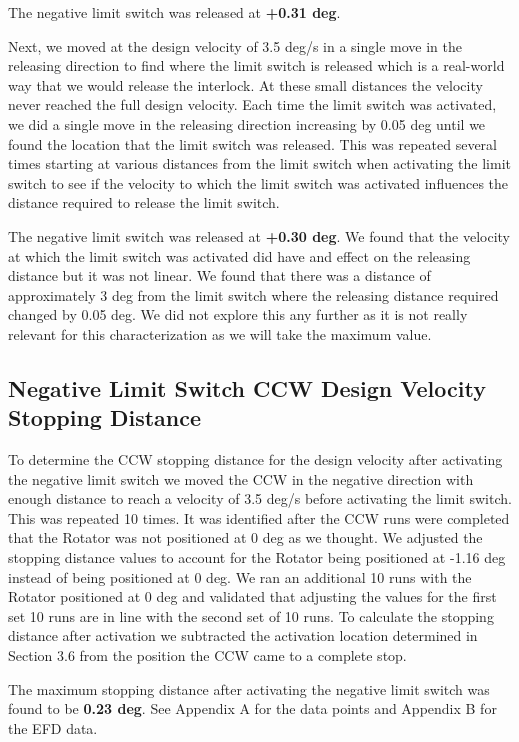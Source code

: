 \documentclass[SE,lsstdraft,authoryear,toc]{lsstdoc}
\begin{document}
The negative limit switch was released at \textbf{+0.31 deg}.

Next, we moved at the design velocity of 3.5 deg/s in a single move in
the releasing direction to find where the limit switch is released which
is a real-world way that we would release the interlock. At these small
distances the velocity never reached the full design velocity. Each time
the limit switch was activated, we did a single move in the releasing
direction increasing by 0.05 deg until we found the location that the
limit switch was released. This was repeated several times starting at
various distances from the limit switch when activating the limit switch
to see if the velocity to which the limit switch was activated
influences the distance required to release the limit switch.

The negative limit switch was released at \textbf{+0.30 deg}. We found
that the velocity at which the limit switch was activated did have and
effect on the releasing distance but it was not linear. We found that
there was a distance of approximately 3 deg from the limit switch where
the releasing distance required changed by 0.05 deg. We did not explore
this any further as it is not really relevant for this characterization
as we will take the maximum value.

\subsection{Negative Limit Switch CCW Design Velocity Stopping Distance}

To determine the CCW stopping distance for the design velocity after
activating the negative limit switch we moved the CCW in the negative
direction with enough distance to reach a velocity of 3.5 deg/s before
activating the limit switch. This was repeated 10 times. It was
identified after the CCW runs were completed that the Rotator was not
positioned at 0 deg as we thought. We adjusted the stopping distance
values to account for the Rotator being positioned at -1.16 deg instead
of being positioned at 0 deg. We ran an additional 10 runs with the
Rotator positioned at 0 deg and validated that adjusting the values for
the first set 10 runs are in line with the second set of 10 runs. To
calculate the stopping distance after activation we subtracted the
activation location determined in Section 3.6 from the position the CCW
came to a complete stop.

The maximum stopping distance after activating the negative limit switch
was found to be \textbf{0.23 deg}. See Appendix A for the data points
and Appendix B for the EFD data.
\end{document}
